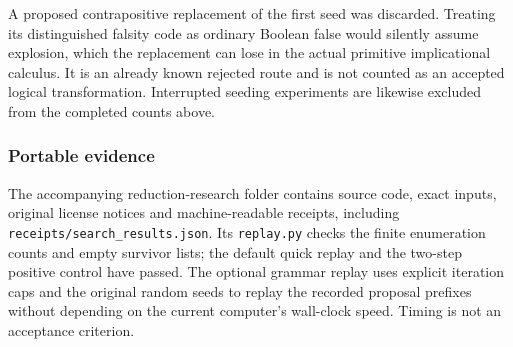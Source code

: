 A proposed contrapositive replacement of the first seed was discarded.
Treating its distinguished falsity code as ordinary Boolean false would
silently assume explosion, which the replacement can lose in the actual
primitive implicational calculus. It is an already known rejected route
and is not counted as an accepted logical transformation. Interrupted
seeding experiments are likewise excluded from the completed counts above.

\subsubsection{Portable evidence}

The accompanying reduction-research folder contains source code, exact
inputs, original license notices and machine-readable receipts, including
\texttt{receipts/search\_results.json}. Its \texttt{replay.py} checks the
finite enumeration counts and empty survivor lists; the default quick
replay and the two-step positive control have passed. The optional grammar
replay uses explicit iteration caps and the original random seeds to replay
the recorded proposal prefixes without depending on the current computer's
wall-clock speed. Timing is not an acceptance criterion.
